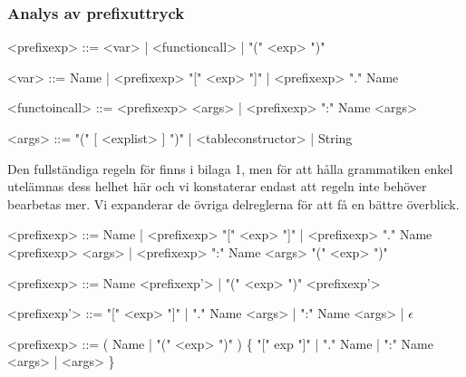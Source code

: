 \subsubsection{Analys av prefixuttryck}

\begin{description}
  \setlength{\grammarindent}{8em}
  \item[Ursprungsregel] \hfill
    \begin{grammar}
      \singlespace\small%
      \selectfont
      <prefixexp> ::= <var> | <functioncall> | "(" <exp> ")"

      <var> ::= Name | <prefixexp> "[" <exp> "]" | <prefixexp> "." Name

      <functoincall> ::= <prefixexp> <args> | <prefixexp> ":" Name <args>

      <args> ::= "(" [ <explist> ] ")" | <tableconstructor> | String
    \end{grammar}

    Den fullständiga regeln för  finns i bilaga 1, men för
    att hålla grammatiken enkel utelämnas dess helhet här och vi konstaterar
    endast att regeln inte behöver bearbetas mer. Vi expanderar de övriga
    delreglerna för att få en bättre överblick.


    \begin{grammar}
      \singlespace\small%
      \selectfont
      <prefixexp> ::= Name | <prefixexp> "[" <exp> "]" | <prefixexp> "." Name
        \alt <prefixexp> <args> | <prefixexp> ":" Name <args>
        \alt "(" <exp> ")"
    \end{grammar}

  \item[Eliminering av vänsterrekursion] \hfill
    \begin{grammar}
      \singlespace\small%
      \selectfont
      <prefixexp> ::= Name <prefixexp'> | "(" <exp> ")" <prefixexp'>

      <prefixexp'> ::= "[" <exp> "]" | "." Name <args> | ":" Name <args> |
      $\epsilon$
    \end{grammar}

  \item[Resultat] \hfill
    \begin{grammar}
      \singlespace\small%
      \selectfont
      <prefixexp> ::= ( Name | "(" <exp> ")" ) \{ "[" exp "]" | "." Name |
          ":" Name <args> | <args> \}
    \end{grammar}
\end{description}

